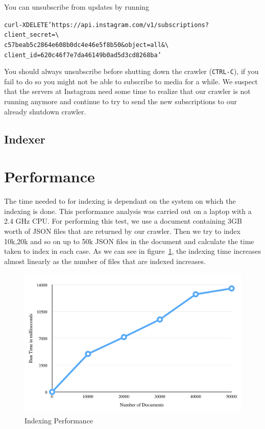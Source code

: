 \documentclass[11pt]{article}
\begin{document}
		You can unsubscribe from updates by running
		\begin{alltt}
			curl -X DELETE 'https://api.instagram.com/v1/subscriptions?client_secret=\textbackslash
			     c57beab5c2864e608b0dc4e46e5f8b50&object=all&\textbackslash
			     client_id=620c46f7e7da46149b0ad5d3cd8268ba'
		\end{alltt}

		You should always unsubscribe before shutting down the crawler (\texttt{CTRL-C}), if you fail to do so you might not be able to subscribe to media for a while. We suspect that the servers at Instagram need some time to realize that our crawler is not running anymore and continue to try to send the new subscriptions to our already shutdown crawler.
	\subsection{Indexer}
\section{Performance}
	The time needed to for indexing is dependant on the system on which the indexing is done. This performance analysis was carried out on a laptop with a 2.4 GHz CPU. For performing this test, we use a document containing 3GB worth of JSON files that are returned by our crawler. Then we try to index 10k,20k and so on up to 50k JSON files in the document and calculate the time taken to index in each case. As we can see in figure~\ref{fig:1}, the indexing time increases almost linearly as the number of files that are indexed increases.
	\begin{figure}
		\includegraphics[keepaspectratio, width=\textwidth]{Chart.png}
		\caption{Indexing Performance}
		\label{fig:1}
	\end{figure}
\end{document}
